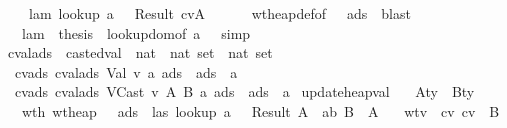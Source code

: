 \begin{isabellebody}
\ \ \ \ lam{}{\isacharcolon}\ {\isachardoublequoteopen}lookup\ a\ {\isasymmu}\ {\isacharequal}\ Result\ {\isacharparenleft}cv{\isacharcomma}A{\isacharparenright}{\isachardoublequoteclose}\ \isanewline
\ \ \ \ \isamarkupfalse \ wt{\isacharunderscore}heap{\isacharunderscore}def{\isacharbrackleft}of\ {\isasymSigma}\ {\isasymmu}\ ads{\isacharbrackright}\ \isamarkupfalse \ blast\ \isamarkupfalse \isanewline
\ \ \isamarkupfalse \ lam{}\ \isamarkupfalse \ {\isacharquery}thesis\ \isamarkupfalse \ lookup{\isacharunderscore}dom{\isacharbrackleft}of\ a\ {\isasymmu}{\isacharbrackright}\ \isamarkupfalse \ simp\ \isamarkupfalse \isanewline
{}\isamarkupfalse \endisatagproof
{\isafoldproof}\isadelimproof
\isanewline
\endisadelimproof
\isanewline
{}\isamarkupfalse \ cval{\isacharunderscore}ads\ {\isacharcolon}{\isacharcolon}\ {\isachardoublequoteopen}casted{\isacharunderscore}val\ {\isasymRightarrow}\ nat\ {\isasymRightarrow}\ nat\ set\ {\isasymRightarrow}\ nat\ set{\isachardoublequoteclose}\ \isanewline
\ \ cvads{}{\isacharcolon}\ {\isachardoublequoteopen}cval{\isacharunderscore}ads\ {\isacharparenleft}Val\ v{\isacharparenright}\ a\ ads\ {\isacharequal}\ ads\ {\isacharminus}\ {\isacharbraceleft}a{\isacharbraceright}{\isachardoublequoteclose}\ {\isacharbar}\isanewline
\ \ cvads{}{\isacharcolon}\ {\isachardoublequoteopen}cval{\isacharunderscore}ads\ {\isacharparenleft}VCast\ v\ A\ B{\isacharparenright}\ a\ ads\ {\isacharequal}\ ads\ {\isasymunion}\ {\isacharbraceleft}a{\isacharbraceright}{\isachardoublequoteclose}\isanewline
\isanewline
{}\isamarkupfalse \ update{\isacharunderscore}heap{\isacharunderscore}val{\isacharcolon}\isanewline
\ \ \ A{\isacharcolon}{\isacharcolon}ty\ \ B{\isacharcolon}{\isacharcolon}ty\isanewline
\ \ \ wth{\isacharcolon}\ {\isachardoublequoteopen}wt{\isacharunderscore}heap\ {\isasymSigma}\ {\isasymmu}\ ads{\isachardoublequoteclose}\ \ las{\isacharcolon}\ {\isachardoublequoteopen}lookup\ a\ {\isasymSigma}\ {\isacharequal}\ Result\ A{\isachardoublequoteclose}\ \ ab{\isacharcolon}\ {\isachardoublequoteopen}B\ {\isasymsqsubseteq}\ A{\isachardoublequoteclose}\isanewline
\ \ \ wtv{\isacharcolon}\ {\isachardoublequoteopen}{\isasymSigma}\ {\isasymturnstile}cv\ cv\ {\isacharcolon}\ B{\isachardoublequoteclose}\isanewline

\end{isabellebody}
